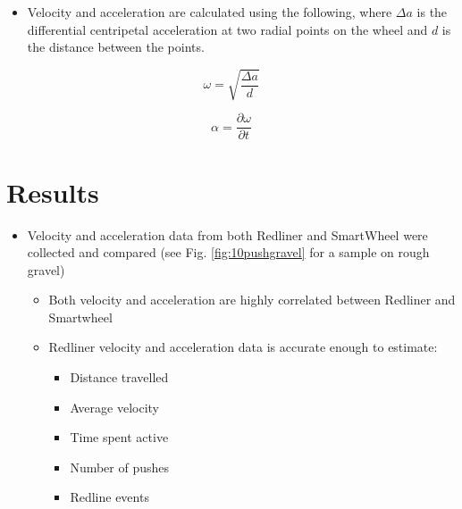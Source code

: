 \documentclass[a0,landscape]{a0poster}
\begin{document}
\begin{multicols*}{3}
\begin{itemize}
    \item Velocity and acceleration are calculated using the following, where $\Delta a$ is the differential centripetal acceleration at two radial points on the wheel and $d$ is the distance between the points.
\end{itemize}

\begin{minipage}{0.5\columnwidth}
    \begin{equation}
        \omega = \sqrt{\frac{\Delta a}{d}}
        \label{equ:velocity}
    \end{equation}
\end{minipage}
%
\begin{minipage}{0.5\columnwidth}
    \begin{equation}
        \alpha = \frac{\partial \omega}{\partial t}
        \label{equ:acceleration}
    \end{equation}
\end{minipage}

\section*{Results}
\begin{itemize}
    \item Velocity and acceleration data from both Redliner and SmartWheel were collected and compared (see Fig. \ref{fig:10pushgravel} for a sample on rough gravel)
    \begin{itemize}
        \item Both velocity and acceleration are highly correlated between Redliner and Smartwheel
        \item Redliner velocity and acceleration data is accurate enough to estimate:
        \begin{itemize}
            \item Distance travelled
            \item Average velocity
            \item Time spent active
            \item Number of pushes
            \item Redline events
        \end{itemize}
    \end{itemize}
\end{itemize}


\end{multicols*}
\end{document}
